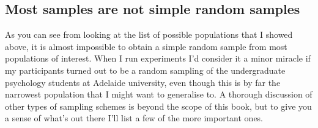 \subsection{Most samples are not simple random samples}

As you can see from looking at the list of possible populations that I showed above, it is almost impossible to obtain a simple random sample from most populations of interest. When I run experiments I'd consider it a minor miracle if my participants turned out to be a random sampling of the undergraduate psychology students at Adelaide university, even though this is by far the narrowest population that I might want to generalise to. A thorough discussion of other types of sampling schemes is beyond the scope of this book, but to give you a sense of what's out there I'll list a few of the more important ones.

